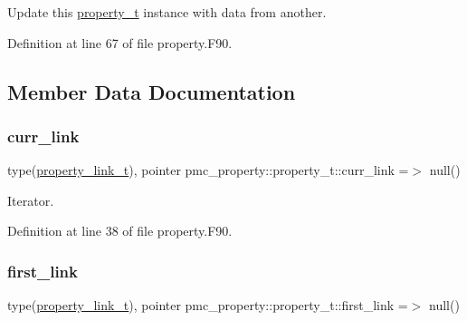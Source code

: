 Update this \mbox{\hyperlink{structpmc__property_1_1property__t}{property\+\_\+t}} instance with data from another. 



Definition at line 67 of file property.\+F90.



\subsection{Member Data Documentation}
\mbox{\label{structpmc__property_1_1property__t_a62b52c857f71e699bdb0e9cc8bc5da26}} 
\subsubsection{\texorpdfstring{curr\+\_\+link}{curr\_link}}
{\footnotesize\ttfamily type(\mbox{\hyperlink{structpmc__property_1_1property__link__t}{property\+\_\+link\+\_\+t}}), pointer pmc\+\_\+property\+::property\+\_\+t\+::curr\+\_\+link =$>$ null()\hspace{0.3cm}{\ttfamily [private]}}



Iterator. 



Definition at line 38 of file property.\+F90.

\mbox{\label{structpmc__property_1_1property__t_a63b8850c3410ddd8418a200658f34066}} 
\subsubsection{\texorpdfstring{first\+\_\+link}{first\_link}}
{\footnotesize\ttfamily type(\mbox{\hyperlink{structpmc__property_1_1property__link__t}{property\+\_\+link\+\_\+t}}), pointer pmc\+\_\+property\+::property\+\_\+t\+::first\+\_\+link =$>$ null()\hspace{0.3cm}{\ttfamily [private]}}



